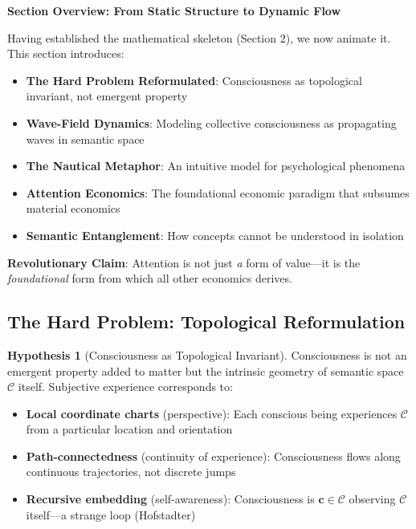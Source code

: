 \documentclass[11pt,a4paper]{article}
\theoremstyle{definition}
\newtheorem{hypothesis}{Hypothesis}[section]
\theoremstyle{remark}
\newcommand{\CC}{\mathcal{C}}
\newcommand{\cc}{\mathbf{c}}
\begin{document}
\begin{small}
\begin{mdframed}[backgroundcolor=cyan!5,linewidth=2pt]
\textbf{Section Overview: From Static Structure to Dynamic Flow}

Having established the mathematical skeleton (Section 2), we now animate it. This section introduces:

\begin{itemize}[nosep]
    \item \textbf{The Hard Problem Reformulated}: Consciousness as topological invariant, not emergent property
    \item \textbf{Wave-Field Dynamics}: Modeling collective consciousness as propagating waves in semantic space
    \item \textbf{The Nautical Metaphor}: An intuitive model for psychological phenomena
    \item \textbf{Attention Economics}: The foundational economic paradigm that subsumes material economics
    \item \textbf{Semantic Entanglement}: How concepts cannot be understood in isolation
\end{itemize}

\textbf{Revolutionary Claim}: Attention is not just \textit{a} form of value—it is the \textit{foundational} form from which all other economics derives.
\end{mdframed}

\subsection{The Hard Problem: Topological Reformulation}

\begin{hypothesis}[Consciousness as Topological Invariant]
Consciousness is not an emergent property added to matter but the intrinsic geometry of semantic space \(\CC\) itself. Subjective experience corresponds to:
\begin{itemize}
\item \textbf{Local coordinate charts} (perspective): Each conscious being experiences \(\CC\) from a particular location and orientation
\item \textbf{Path-connectedness} (continuity of experience): Consciousness flows along continuous trajectories, not discrete jumps
\item \textbf{Recursive embedding} (self-awareness): Consciousness is \(\cc \in \CC\) observing \(\CC\) itself—a strange loop (Hofstadter)
\end{itemize}
\end{hypothesis}


\end{small}
\end{document}
